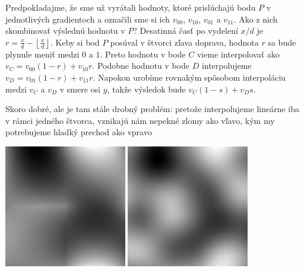 Predpokladajme, že sme už vyrátali hodnoty, ktoré prislúchajú bodu $P$ v
jednotlivých gradientoch a označili sme si ich
$v_{00}$, $v_{10}$, $v_{01}$ a $v_{11}$. Ako z nich skombinovať výslednú hodnotu v $P$? 
Desatinná časť po vydelení $x/d$ 
je $r=\frac{x}{d}-\left\lfloor\frac{x}{d}\right\rfloor$. Keby si bod $P$
posúval v štvorci zľava doprava, hodnota $r$ sa bude plynule meniť medzi $0$ a $1$.
Preto hodnotu v bode $C$ vieme interpolovať ako $v_C=v_{00}(1-r)+v_{10}r$. 
Podobne hodnotu v bode $D$ interpolujeme
$v_D=v_{01}(1-r)+v_{11}r$. 
Napokon urobíme rovnakým spôsobom interpoláciu medzi $v_C$ a $v_D$ v smere osi $y$, 
takže výsledok bude $v_C(1-s)+v_Ds$. 


Skoro dobré, ale  je tam stále drobný
problém: pretože interpolujeme lineárne iba v rámci jedného štvorca,
vznikajú nám nepekné zlomy ako vľavo, kým my potrebujeme hladký prechod ako vpravo\\


\centerline{
  \includegraphics[width=0.4\textwidth]{data/perlinL_fixed.png}
  \hskip 1cm
  \includegraphics[width=0.4\textwidth]{data/perlin_fixed.png}
}

\phantom{a}
\hfill
{}
  \hfill
{}
\hfill
\phantom{a}



